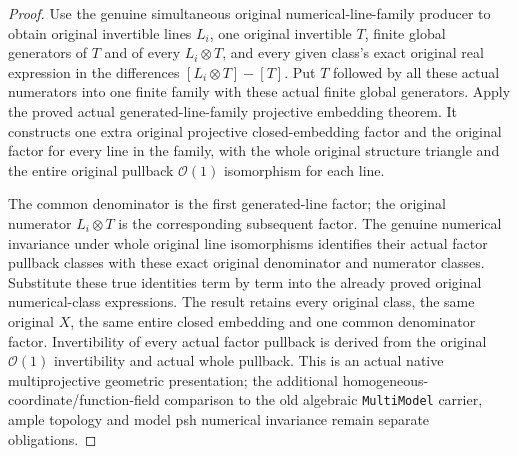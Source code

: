 \begin{proof}
Use the genuine simultaneous original numerical-line-family
producer to obtain original invertible lines $L_i$, one original
invertible $T$, finite global generators of $T$ and of every
$L_i\otimes T$, and every given class's exact original real
expression in the differences $[L_i\otimes T]-[T]$.
Put $T$ followed by all these actual numerators into one finite
family with these actual finite global generators. Apply the
proved actual generated-line-family projective embedding theorem.
It constructs one extra original projective closed-embedding
factor and the original factor for every line in the family,
with the whole original structure triangle and the entire
original pullback $\mathcal O(1)$ isomorphism for each line.

The common denominator is the first generated-line factor; the
original numerator $L_i\otimes T$ is the corresponding subsequent
factor. The genuine numerical invariance under whole original
line isomorphisms identifies their actual factor pullback classes
with these exact original denominator and numerator classes.
Substitute these true identities term by term into the already
proved original numerical-class expressions. The result retains
every original class, the same original $X$, the same entire
closed embedding and one common denominator factor. Invertibility
of every actual factor pullback is derived from the original
$\mathcal O(1)$ invertibility and actual whole pullback. This is
an actual native multiprojective geometric presentation; the
additional homogeneous-coordinate/function-field comparison to
the old algebraic \texttt{MultiModel} carrier, ample topology and
model psh numerical invariance remain separate obligations.
\end{proof}
